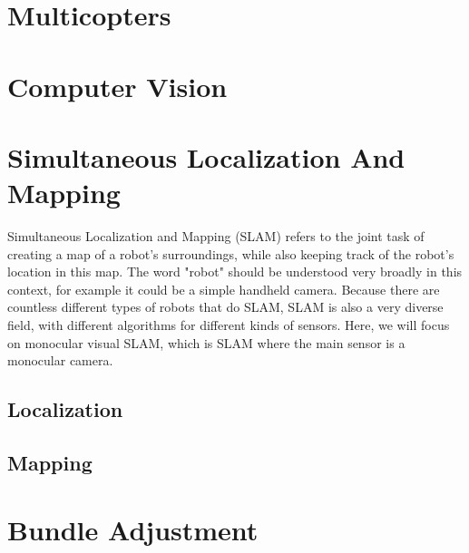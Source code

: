 \section{Multicopters}

\section{Computer Vision}

\section{Simultaneous Localization And Mapping}
Simultaneous Localization and Mapping (SLAM) refers to the joint task of creating a map of a robot's surroundings, while also keeping track of the robot's location in this map. The word "robot" should be understood very broadly in this context, for example it could be a simple handheld camera. Because there are countless different types of robots that do SLAM, SLAM is also a very diverse field, with different algorithms for different kinds of sensors. Here, we will focus on monocular visual SLAM, which is SLAM where the main sensor is a monocular camera.

\subsection{Localization}

\subsection{Mapping}

\section{Bundle Adjustment}
